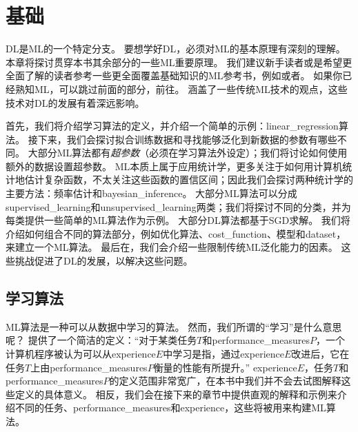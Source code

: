 \chapter{基础}
\label{chap:machine_learning_basics}
\gls{DL}是\gls{ML}的一个特定分支。
要想学好\gls{DL}，必须对\gls{ML}的基本原理有深刻的理解。
本章将探讨贯穿本书其余部分的一些\gls{ML}重要原理。
我们建议新手读者或是希望更全面了解的读者参考一些更全面覆盖基础知识的\gls{ML}参考书，例如\cite{MurphyBook2012}或者\cite{bishop-book2006}。
如果你已经熟知\gls{ML}，可以跳过前面的部分，前往。
涵盖了一些传统\gls{ML}技术的观点，这些技术对\gls{DL}的发展有着深远影响。

首先，我们将介绍学习算法的定义，并介绍一个简单的示例：\gls{linear_regression}算法。
接下来，我们会探讨拟合训练数据和寻找能够泛化到新数据的参数有哪些不同。
大部分\gls{ML}算法都有\emph{超参数}（必须在学习算法外设定）；我们将讨论如何使用额外的数据设置超参数。
\gls{ML}本质上属于应用统计学，更多关注于如何用计算机统计地估计复杂函数，不太关注这些函数的置信区间；因此我们会探讨两种统计学的主要方法：频率估计和\gls{bayesian_inference}。
大部分\gls{ML}算法可以分成\gls{supervised_learning}和\gls{unsupervised_learning}两类；我们将探讨不同的分类，并为每类提供一些简单的\gls{ML}算法作为示例。
大部分\gls{DL}算法都基于\gls{SGD}求解。
我们将介绍如何组合不同的算法部分，例如优化算法、\gls{cost_function}、模型和\gls{dataset}，来建立一个\gls{ML}算法。
最后在，我们会介绍一些限制传统\gls{ML}泛化能力的因素。
这些挑战促进了\gls{DL}的发展，以解决这些问题。


\section{学习算法}
\label{sec:learning_algorithms}
\gls{ML}算法是一种可以从数据中学习的算法。
然而，我们所谓的``学习''是什么意思呢？
\cite{Mitchell:1997:ML}提供了一个简洁的定义：``对于某类任务$T$和\gls{performance_measures}$P$，一个计算机程序被认为可以从\gls{experience}$E$中学习是指，通过\gls{experience}$E$改进后，它在任务$T$上由\gls{performance_measures}$P$衡量的性能有所提升。''
\gls{experience}$E$，任务$T$和\gls{performance_measures}$P$的定义范围非常宽广，在本书中我们并不会去试图解释这些定义的具体意义。
相反，我们会在接下来的章节中提供直观的解释和示例来介绍不同的任务、\gls{performance_measures}和\gls{experience}，这些将被用来构建\gls{ML}算法。

